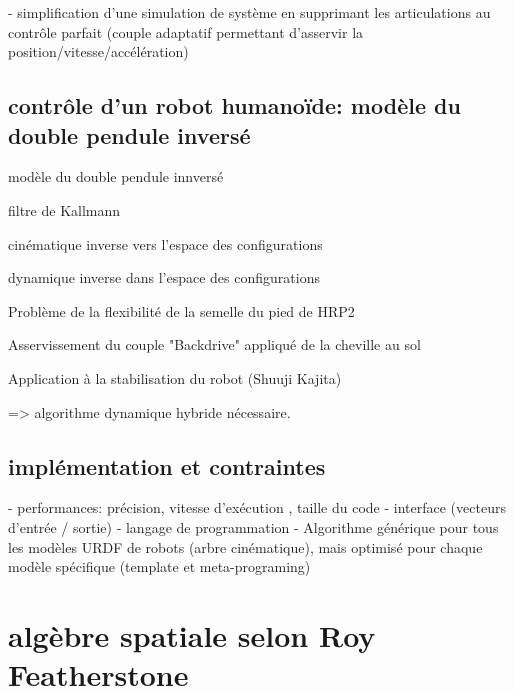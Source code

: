 \documentclass{report}
\begin{document}
	- simplification d'une simulation de système en supprimant les articulations au contrôle parfait (couple adaptatif permettant d'asservir la position/vitesse/accélération)


\section{contrôle d'un robot humanoïde: modèle du double pendule inversé}

modèle du double pendule innversé

filtre de Kallmann

cinématique inverse vers l'espace des configurations

dynamique inverse dans l'espace des configurations

Problème de la flexibilité de la semelle du pied de HRP2

Asservissement du couple "Backdrive" appliqué de la cheville au sol

Application à la stabilisation du robot (Shuuji Kajita)

=> algorithme dynamique hybride nécessaire.

\section{implémentation et contraintes} \label{ch_concepts_implEtContr}
- performances: précision, vitesse d'exécution , taille du code\vspace{0.3cm}
- interface (vecteurs d'entrée / sortie)\vspace{0.3cm}
- langage de programmation\vspace{0.3cm}
- Algorithme générique pour tous les modèles URDF de robots (arbre cinématique), mais optimisé pour chaque modèle spécifique (template et meta-programing)\vspace{0.3cm}



\chapter{algèbre spatiale selon Roy Featherstone}
\end{document}
